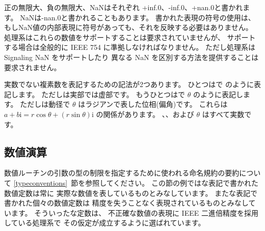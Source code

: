 正の無限大、負の無限大、NaNはそれぞれ
{\cf +inf.0}、{\cf -inf.0}、{\cf +nan.0}と書かれます。
NaNは{\cf -nan.0}と書かれることもあります。
書かれた表現の符号の使用は、もしNaN値の内部表現に符号があっても、それを反映する必要はありません。
処理系はこれらの数値をサポートすることは要求されていませんが、
サポートする場合は全般的に IEEE 754 に準拠しなければなりません。
ただし処理系は Signaling NaN をサポートしたり
異なる NaN を区別する方法を提供することは要求されません。

実数でない複素数を表記するための記法が2つあります。
ひとつはで  のように表記します。
ただしは実部では虚部です。
もうひとつはで $\theta$ のように表記します。
ただしは動径で $\theta$ はラジアンで表した位相(偏角)です。
これらは
$a+b\mathrm{i} = r \cos\theta + (r \sin\theta) \mathrm{i}$
の関係があります。
、、および $\theta$ はすべて実数です。


\subsection{数値演算}

数値ルーチンの引数の型の制限を指定するために使われる命名規約の要約について
\ref{typeconventions}~節を参照してください。
この節の例ではな表記で書かれた数値定数は常に
実際な数値を表しているものとみなしています。
またな表記で書かれた個々の数値定数は
精度を失うことなく表現されているものとみなしています。
そういったな定数は、
不正確な数値の表現に IEEE 二進倍精度を採用している処理系で
その仮定が成立するように選ばれています。


